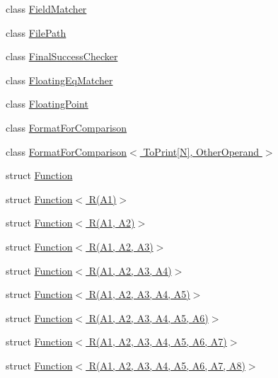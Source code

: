 \begin{DoxyCompactItemize}
class \hyperlink{classtesting_1_1internal_1_1_field_matcher}{Field\+Matcher}
\item 
class \hyperlink{classtesting_1_1internal_1_1_file_path}{File\+Path}
\item 
class \hyperlink{classtesting_1_1internal_1_1_final_success_checker}{Final\+Success\+Checker}
\item 
class \hyperlink{classtesting_1_1internal_1_1_floating_eq_matcher}{Floating\+Eq\+Matcher}
\item 
class \hyperlink{classtesting_1_1internal_1_1_floating_point}{Floating\+Point}
\item 
class \hyperlink{classtesting_1_1internal_1_1_format_for_comparison}{Format\+For\+Comparison}
\item 
class \hyperlink{classtesting_1_1internal_1_1_format_for_comparison_3_01_to_print[_n]_00_01_other_operand_01_4}{Format\+For\+Comparison$<$ To\+Print\mbox{[}\+N\mbox{]}, Other\+Operand $>$}
\item 
struct \hyperlink{structtesting_1_1internal_1_1_function}{Function}
\item 
struct \hyperlink{structtesting_1_1internal_1_1_function_3_01_r_07_a1_08_4}{Function$<$ R(\+A1)$>$}
\item 
struct \hyperlink{structtesting_1_1internal_1_1_function_3_01_r_07_a1_00_01_a2_08_4}{Function$<$ R(\+A1, A2)$>$}
\item 
struct \hyperlink{structtesting_1_1internal_1_1_function_3_01_r_07_a1_00_01_a2_00_01_a3_08_4}{Function$<$ R(\+A1, A2, A3)$>$}
\item 
struct \hyperlink{structtesting_1_1internal_1_1_function_3_01_r_07_a1_00_01_a2_00_01_a3_00_01_a4_08_4}{Function$<$ R(\+A1, A2, A3, A4)$>$}
\item 
struct \hyperlink{structtesting_1_1internal_1_1_function_3_01_r_07_a1_00_01_a2_00_01_a3_00_01_a4_00_01_a5_08_4}{Function$<$ R(\+A1, A2, A3, A4, A5)$>$}
\item 
struct \hyperlink{structtesting_1_1internal_1_1_function_3_01_r_07_a1_00_01_a2_00_01_a3_00_01_a4_00_01_a5_00_01_a6_08_4}{Function$<$ R(\+A1, A2, A3, A4, A5, A6)$>$}
\item 
struct \hyperlink{structtesting_1_1internal_1_1_function_3_01_r_07_a1_00_01_a2_00_01_a3_00_01_a4_00_01_a5_00_01_a6_00_01_a7_08_4}{Function$<$ R(\+A1, A2, A3, A4, A5, A6, A7)$>$}
\item 
struct \hyperlink{structtesting_1_1internal_1_1_function_3_01_r_07_a1_00_01_a2_00_01_a3_00_01_a4_00_01_a5_00_01_a6_00_01_a7_00_01_a8_08_4}{Function$<$ R(\+A1, A2, A3, A4, A5, A6, A7, A8)$>$}

\end{DoxyCompactItemize}

